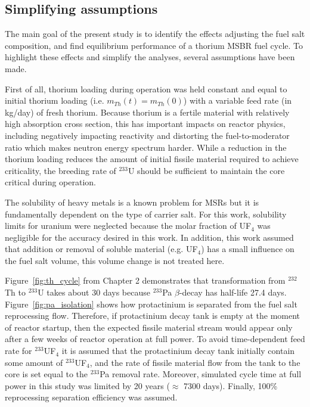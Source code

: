 \subsection{Simplifying assumptions}
The main goal of the present study is to identify the effects adjusting the fuel salt composition, and find equilibrium performance of a thorium \gls{MSBR} fuel cycle. To highlight these effects and simplify the analyses, several assumptions have been made.

First of all, thorium loading during operation was held constant and equal to initial thorium loading (i.e. $m_{Th}(t)=m_{Th}(0)$) with a variable feed rate (in kg/day) of fresh thorium. Because thorium is a fertile material with relatively high absorption cross section, this has important impacts on reactor physics, including negatively impacting reactivity and distorting the fuel-to-moderator ratio which makes neutron energy spectrum harder. While a reduction in the thorium loading reduces the amount of initial fissile material required to achieve criticality, the breeding rate of $^{233}$U should be sufficient to maintain the core critical during operation.

The solubility of heavy metals is a known problem for \glspl{MSR} but it is fundamentally dependent on the type of carrier salt. For this work, solubility limits for uranium were neglected because the molar fraction of UF$_4$ was negligible for the accuracy desired in this work. In addition, this work assumed that addition or removal of soluble material (e.g. UF$_4$) has a small influence on the fuel salt volume, this volume change is not treated here.

Figure~\ref{fig:th_cycle} from Chapter 2 demonstrates that transformation from $^{232}$Th to $^{233}$U takes about 30 days because $^{233}$Pa $\beta$-decay has half-life 27.4 days. Figure~\ref{fig:pa_isolation} shows how protactinium is separated from the fuel salt reprocessing flow. Therefore, if protactinium decay tank is empty at the moment of reactor startup, then the expected fissile material stream would appear only after a few weeks of reactor operation at full power. To avoid time-dependent feed rate for $^{233}$UF$_4$ it is assumed that the protactinium decay tank initially contain some amount of $^{233}$UF$_4$, and the rate of fissile material flow from the tank to the core is set equal to the $^{233}$Pa removal rate. Moreover, simulated cycle time at full power in this study was limited by 20 years ($\approx$ 7300 days). Finally, 100\% reprocessing separation efficiency was assumed.

